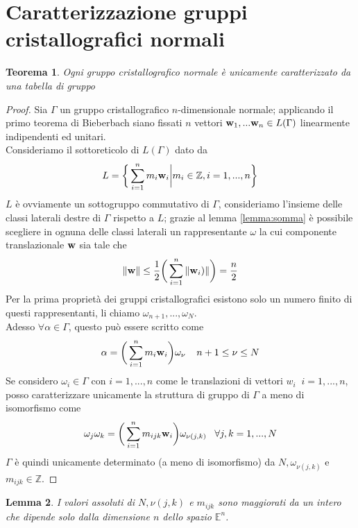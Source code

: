\documentclass[a4paper,11pt,openright,twoside	]{book}
\newtheorem{theorem}{Teorema}[section]
\newtheorem{lemma}[theorem]{Lemma}
\begin{document}
\section{Caratterizzazione gruppi cristallografici normali}
\begin{theorem}
\label{teo:caratnorm}
Ogni gruppo cristallografico normale è unicamente caratterizzato da una tabella di gruppo 
\end{theorem}

\begin{proof}
Sia $\Gamma$ un gruppo cristallografico $n$-dimensionale normale;	 applicando il primo teorema di Bieberbach siano fissati $n$ vettori $\vb{w}_1, ... \vb{w}_n \in L(\Gamma) $ linearmente indipendenti ed unitari. \\
Consideriamo il sottoreticolo  di $L(\Gamma)$ dato da 
\[ L = \bigg\{ \sum_{i = 1}^{n} m_i \vb{w}_i \bigg| m_i \in \mathbb{Z}, i = 1, ..., n \bigg\} \]
$L$ è ovviamente un sottogruppo commutativo di $\Gamma$, consideriamo l'insieme delle classi laterali destre di $ \Gamma$ rispetto a $L$; grazie al lemma \ref{lemma:somma} è possibile scegliere in ognuna delle classi laterali un rappresentante $\omega$ la cui componente translazionale $\vb{w} $ sia tale che 
\[ \norm{\vb{w}} \leq \frac{1}{2} \bigg( \sum_{i = 1}^{n} \norm{ \vb{w}_i)} \bigg) = \frac{n}{2}\]  
Per la prima proprietà dei gruppi cristallografici esistono solo un numero finito di questi rappresentanti, li chiamo $\omega_{n+1}, ... , \omega_N$. \\
Adesso $\forall \alpha \in \Gamma$, questo può essere scritto come 
\[ \alpha = \bigg( \sum_{i = 1}^{n} m_i \vb{w}_i \bigg) \omega_{\nu} \; \; \; \; n+1 \leq \nu \leq N\]
Se considero $\omega_i \in \Gamma$ con $i=1, ...,n$ come le translazioni di vettori $w_i \; \; i=1, ...,n$, posso caratterizzare unicamente la struttura di gruppo di $\Gamma$ a meno di isomorfismo come 
\begin{equation} \label{eq:1}
	 \omega_j \omega_k = \bigg( \sum_{i = 1}^{n} m_{ijk} \vb{w}_i\bigg) \omega_{\nu (j,k)}      \; \; \; \forall j,k =1, ...,N 
\end{equation}
$\Gamma$  è quindi unicamente determinato (a meno di isomorfismo) da $N, \omega_{\nu (j,k)}$ e $m_{ijk} \in \mathbb{Z}$.

\end{proof}

\begin{lemma}
\label{lemma:valass}
I valori assoluti di $N, \nu (j,k)$  e $m_{ijk}$ sono maggiorati da un intero che dipende solo dalla dimensione $n$ dello spazio $\mathbb{E}^n$.
\end{lemma}
\end{document}
